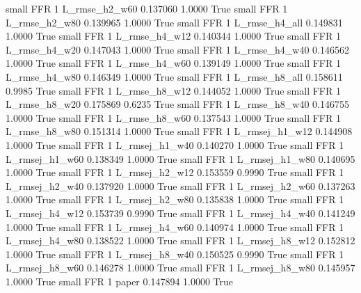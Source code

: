      small      FFR                 1  L_rmse_h2_w60   0.137060      1.0000    True
     small      FFR                 1  L_rmse_h2_w80   0.139965      1.0000    True
     small      FFR                 1  L_rmse_h4_all   0.149831      1.0000    True
     small      FFR                 1  L_rmse_h4_w12   0.140344      1.0000    True
     small      FFR                 1  L_rmse_h4_w20   0.147043      1.0000    True
     small      FFR                 1  L_rmse_h4_w40   0.146562      1.0000    True
     small      FFR                 1  L_rmse_h4_w60   0.139149      1.0000    True
     small      FFR                 1  L_rmse_h4_w80   0.146349      1.0000    True
     small      FFR                 1  L_rmse_h8_all   0.158611      0.9985    True
     small      FFR                 1  L_rmse_h8_w12   0.144052      1.0000    True
     small      FFR                 1  L_rmse_h8_w20   0.175869      0.6235    True
     small      FFR                 1  L_rmse_h8_w40   0.146755      1.0000    True
     small      FFR                 1  L_rmse_h8_w60   0.137543      1.0000    True
     small      FFR                 1  L_rmse_h8_w80   0.151314      1.0000    True
     small      FFR                 1 L_rmsej_h1_w12   0.144908      1.0000    True
     small      FFR                 1 L_rmsej_h1_w40   0.140270      1.0000    True
     small      FFR                 1 L_rmsej_h1_w60   0.138349      1.0000    True
     small      FFR                 1 L_rmsej_h1_w80   0.140695      1.0000    True
     small      FFR                 1 L_rmsej_h2_w12   0.153559      0.9990    True
     small      FFR                 1 L_rmsej_h2_w40   0.137920      1.0000    True
     small      FFR                 1 L_rmsej_h2_w60   0.137263      1.0000    True
     small      FFR                 1 L_rmsej_h2_w80   0.135838      1.0000    True
     small      FFR                 1 L_rmsej_h4_w12   0.153739      0.9990    True
     small      FFR                 1 L_rmsej_h4_w40   0.141249      1.0000    True
     small      FFR                 1 L_rmsej_h4_w60   0.140974      1.0000    True
     small      FFR                 1 L_rmsej_h4_w80   0.138522      1.0000    True
     small      FFR                 1 L_rmsej_h8_w12   0.152812      1.0000    True
     small      FFR                 1 L_rmsej_h8_w40   0.150525      0.9990    True
     small      FFR                 1 L_rmsej_h8_w60   0.146278      1.0000    True
     small      FFR                 1 L_rmsej_h8_w80   0.145957      1.0000    True
     small      FFR                 1          paper   0.147894      1.0000    True
